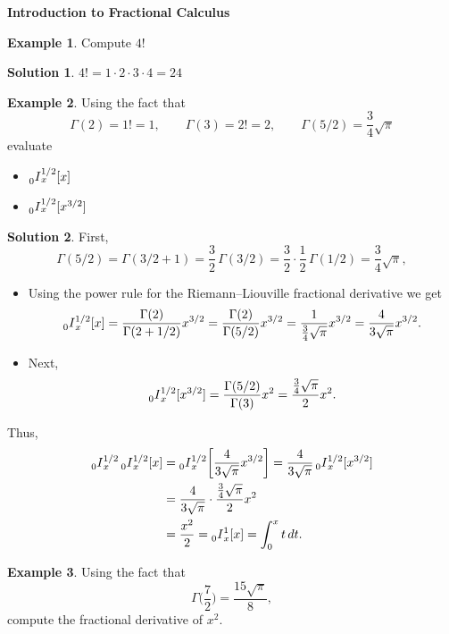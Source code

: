 \documentclass[12pt]{article}
\theoremstyle{definition}
\newtheorem*{example*}{Example}
\newtheorem*{solution*}{Solution}
\newcommand{\I}[2]{\prescript{}{#1}{I}_x^{#2}}
\begin{document}

\begin{center}
{\bf {\Large Introduction to Fractional Calculus}}\\[1cm]
\end{center}


\begin{example*}
Compute $4!$
\end{example*}

\begin{solution*}
$4! = 1\cdot 2 \cdot 3 \cdot 4 = 24$
\end{solution*}

\begin{example*}
Using the fact that
\[
\Gamma(2) = 1! = 1,\qquad \Gamma(3) = 2! = 2,\qquad \Gamma(5/2) = \frac{3}{4}\sqrt{\pi}
\]
evaluate
\begin{itemize}
\item[(a)] $\I{0}{1/2}[x]$
\item[(b)] $\I{0}{1/2}[x^{3/2}]$
\end{itemize}
\end{example*}

\begin{solution*}
First, 
\[
\Gamma(5/2) = \Gamma(3/2+1) = \frac{3}{2}\, \Gamma(3/2) = \frac{3}{2}\cdot \frac{1}{2}\, \Gamma(1/2) = \frac{3}{4}\sqrt{\pi},
\]
\begin{itemize}
\item[(a)] Using the power rule for the Riemann--Liouville fractional derivative we get
\[
\I{0}{1/2}[x] = \frac{\Gamma(2)}{\Gamma(2+1/2)} x^{3/2} = \frac{\Gamma(2)}{\Gamma(5/2)}x^{3/2} = \frac{1}{\frac{3}{4}\sqrt{\pi}} x^{3/2} = \frac{4}{3\sqrt{\pi}}x^{3/2}.
\]
\item[(b)]Next,
\[
\I{0}{1/2}[x^{3/2}] = \frac{\Gamma(5/2)}{\Gamma(3)} x^2 = \frac{\frac{3}{4}\sqrt{\pi}}{2} x^2.
\]
\end{itemize}
Thus,
\begin{align*}
\I{0}{1/2} \I{0}{1/2}[x] &= \I{0}{1/2}\bigg[\frac{4}{3\sqrt{\pi}}x^{3/2}\bigg]
= \frac{4}{3\sqrt{\pi}} \I{0}{1/2}[x^{3/2}] \\
&= \frac{4}{3\sqrt{\pi}}\cdot \frac{\frac{3}{4}\sqrt{\pi}}{2} x^2 \\
& = \frac{x^2}{2} = \I{0}{1}[x] = \int_0^x t\, dt.
\end{align*}
\end{solution*}

\begin{example*}
Using the fact that 
\[
\Gamma\bigg(\frac{7}{2}\bigg) = \frac{15\sqrt{\pi}}{8},
\]
compute the fractional derivative of $x^2$.
\end{example*}
\end{document}
